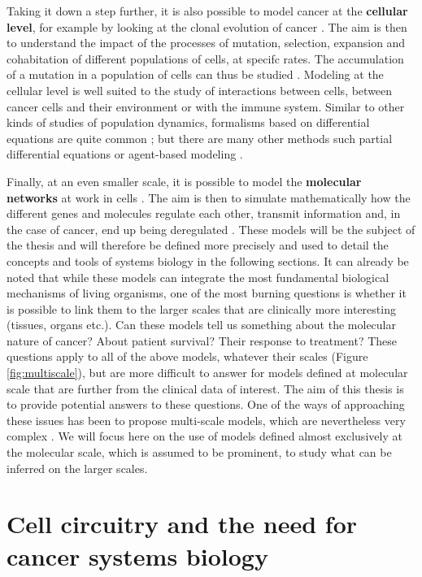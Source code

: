 \documentclass[a4paper,12pt,twoside,onecolumn,openright,final,oldfontcommands]{memoir}
\begin{document}
Taking it down a step further, it is also possible to model cancer at
the \textbf{cellular level}, for example by looking at the clonal
evolution of cancer \citep{altrock2015mathematics}. The aim is then to
understand the impact of the processes of mutation, selection, expansion
and cohabitation of different populations of cells, at specifc rates.
The accumulation of a mutation in a population of cells can thus be
studied \citep{bozic2010accumulation}. Modeling at the cellular level is
well suited to the study of interactions between cells, between cancer
cells and their environment or with the immune system. Similar to other
kinds of studies of population dynamics, formalisms based on
differential equations are quite common \citep{bellomo2008foundations};
but there are many other methods such partial differential equations or
agent-based modeling \citep{letort2019physiboss}.

Finally, at an even smaller scale, it is possible to model the
\textbf{molecular networks} at work in cells \citep{le2015quantitative}.
The aim is then to simulate mathematically how the different genes and
molecules regulate each other, transmit information and, in the case of
cancer, end up being deregulated \citep{calzone2010mathematical}. These
models will be the subject of the thesis and will therefore be defined
more precisely and used to detail the concepts and tools of systems
biology in the following sections. It can already be noted that while
these models can integrate the most fundamental biological mechanisms of
living organisms, one of the most burning questions is whether it is
possible to link them to the larger scales that are clinically more
interesting (tissues, organs etc.). Can these models tell us something
about the molecular nature of cancer? About patient survival? Their
response to treatment? These questions apply to all of the above models,
whatever their scales (Figure \ref{fig:multiscale}), but are more
difficult to answer for models defined at molecular scale that are
further from the clinical data of interest. The aim of this thesis is to
provide potential answers to these questions. One of the ways of
approaching these issues has been to propose multi-scale models, which
are nevertheless very complex
\citep{anderson2008integrative, powathil2015systems}. We will focus here
on the use of models defined almost exclusively at the molecular scale,
which is assumed to be prominent, to study what can be inferred on the
larger scales.

\section{Cell circuitry and the need for cancer systems
biology}\label{cell-circuitry-and-the-need-for-cancer-systems-biology}
\end{document}
